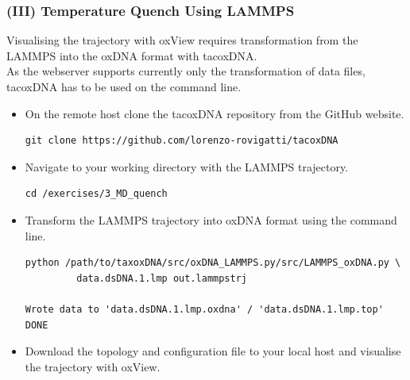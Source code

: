 \documentclass[slidestop,compress,9pt]{beamer}
\begin{document}
\begin{frame}[fragile]
\frametitle{(III) Temperature Quench Using LAMMPS}

Visualising the trajectory with oxView requires transformation from the LAMMPS into the oxDNA format with tacoxDNA.\\[5pt]
As the webserver supports currently only the transformation of data files, tacoxDNA has to be used on the command line.

\begin{itemize}

\item On the remote host clone the tacoxDNA repository from the GitHub website.
\begin{lstlisting}
git clone https://github.com/lorenzo-rovigatti/tacoxDNA
\end{lstlisting}
\item Navigate to your working directory with the LAMMPS trajectory.
\begin{lstlisting}
cd /exercises/3_MD_quench
\end{lstlisting}
\item Transform the LAMMPS trajectory into oxDNA format using the command line. 
\begin{lstlisting}
python /path/to/taxoxDNA/src/oxDNA_LAMMPS.py/src/LAMMPS_oxDNA.py \
         data.dsDNA.1.lmp out.lammpstrj

Wrote data to 'data.dsDNA.1.lmp.oxdna' / 'data.dsDNA.1.lmp.top'
DONE
\end{lstlisting}
\item Download the topology and configuration file to your local host and visualise the trajectory with oxView.

\end{itemize}


\end{frame}
\end{document}
